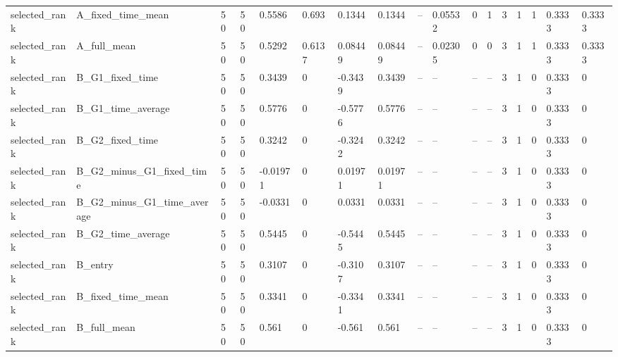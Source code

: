 \begin{longtable}{lllllllllllllllll}
selected\_rank & A\_fixed\_time\_mean & 50 & 50 & 0.5586 & 0.693 & 0.1344 & 0.1344 & -- & 0.05532 & 0 & 1 & 3 & 1 & 1 & 0.3333 & 0.3333 \\
selected\_rank & A\_full\_mean & 50 & 50 & 0.5292 & 0.6137 & 0.08449 & 0.08449 & -- & 0.02305 & 0 & 0 & 3 & 1 & 1 & 0.3333 & 0.3333 \\
selected\_rank & B\_G1\_fixed\_time & 50 & 50 & 0.3439 & 0 & -0.3439 & 0.3439 & -- & -- & -- & -- & 3 & 1 & 0 & 0.3333 & 0 \\
selected\_rank & B\_G1\_time\_average & 50 & 50 & 0.5776 & 0 & -0.5776 & 0.5776 & -- & -- & -- & -- & 3 & 1 & 0 & 0.3333 & 0 \\
selected\_rank & B\_G2\_fixed\_time & 50 & 50 & 0.3242 & 0 & -0.3242 & 0.3242 & -- & -- & -- & -- & 3 & 1 & 0 & 0.3333 & 0 \\
selected\_rank & B\_G2\_minus\_G1\_fixed\_time & 50 & 50 & -0.01971 & 0 & 0.01971 & 0.01971 & -- & -- & -- & -- & 3 & 1 & 0 & 0.3333 & 0 \\
selected\_rank & B\_G2\_minus\_G1\_time\_average & 50 & 50 & -0.0331 & 0 & 0.0331 & 0.0331 & -- & -- & -- & -- & 3 & 1 & 0 & 0.3333 & 0 \\
selected\_rank & B\_G2\_time\_average & 50 & 50 & 0.5445 & 0 & -0.5445 & 0.5445 & -- & -- & -- & -- & 3 & 1 & 0 & 0.3333 & 0 \\
selected\_rank & B\_entry & 50 & 50 & 0.3107 & 0 & -0.3107 & 0.3107 & -- & -- & -- & -- & 3 & 1 & 0 & 0.3333 & 0 \\
selected\_rank & B\_fixed\_time\_mean & 50 & 50 & 0.3341 & 0 & -0.3341 & 0.3341 & -- & -- & -- & -- & 3 & 1 & 0 & 0.3333 & 0 \\
selected\_rank & B\_full\_mean & 50 & 50 & 0.561 & 0 & -0.561 & 0.561 & -- & -- & -- & -- & 3 & 1 & 0 & 0.3333 & 0 \\
\bottomrule
\end{longtable}
\endgroup
